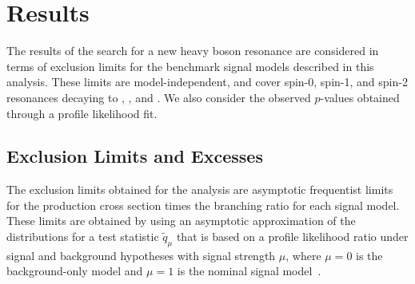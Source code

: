 
\section{Results}
\label{sec:results}

The results of the search for a new heavy boson resonance are considered in terms of exclusion limits for the benchmark signal models described in this analysis.
These limits are model-independent, and cover spin-0, spin-1, and spin-2 resonances decaying to \WW, \WZ, and \WH.
We also consider the observed $p$-values obtained through a profile likelihood fit.

\subsection{Exclusion Limits and Excesses}

The exclusion limits obtained for the analysis are asymptotic frequentist limits for the production cross section times the branching ratio for each signal model.
These limits are obtained by using an asymptotic approximation of the distributions for a test statistic $\tilde{q}_\mu$ that is based on a profile likelihood ratio under signal and background hypotheses with signal strength $\mu$, where $\mu=0$ is the background-only model and $\mu=1$ is the nominal signal model~\cite{Cowan_2011,CMS-NOTE-2011-005}.

